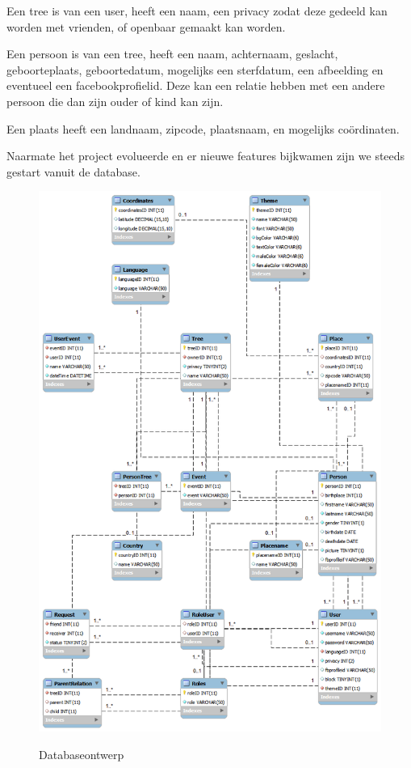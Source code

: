 \documentclass[pdftex,a4paper,12pt,twoside]{report}
\begin{document}
Een tree is van een user, heeft een naam, een privacy zodat deze gedeeld kan worden met vrienden, of openbaar gemaakt kan worden.

Een persoon is van een tree, heeft een naam, achternaam, geslacht, geboorteplaats,  geboortedatum, mogelijks een sterfdatum, een afbeelding en eventueel een facebookprofielid.  Deze kan een relatie hebben met een andere persoon die dan zijn ouder of kind kan zijn.

Een plaats heeft een landnaam, zipcode, plaatsnaam, en mogelijks coördinaten.

Naarmate het project evolueerde en er nieuwe features bijkwamen zijn we steeds gestart vanuit de database.

\begin{figure}[!htb]
\includegraphics[width=\textwidth]{images/db.png}\\
\caption{Databaseontwerp}
\end{figure}
\end{document}
